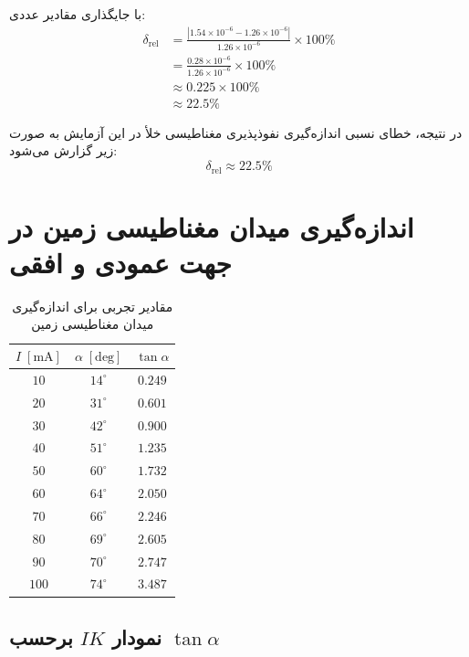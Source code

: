 \documentclass[a4paper, 11pt]{article}
\begin{document}
با جایگذاری مقادیر عددی:
\begin{align}
\delta_{\mathrm{rel}}
&= \frac{|1.54 \times 10^{-6} - 1.26 \times 10^{-6}|}{1.26 \times 10^{-6}} \times 100\% \\[4pt]
&= \frac{0.28 \times 10^{-6}}{1.26 \times 10^{-6}} \times 100\% \\[4pt]
&\approx 0.225 \times 100\% \\[4pt]
&\approx 22.5\%
\end{align}

در نتیجه، خطای نسبی اندازه‌گیری نفوذپذیری مغناطیسی خلأ در این آزمایش به صورت زیر گزارش می‌شود:
\begin{equation}
\boxed{
\delta_{\mathrm{rel}} \approx 22.5\%
}
\end{equation}



\section{ اندازه‌گیری میدان مغناطیسی زمین در جهت عمودی و افقی}

\begin{table}[h!]
\caption{مقادیر تجربی برای اندازه‌گیری میدان مغناطیسی زمین}
\centering
\begin{tabular}{ccc}
\hline
$I \;[\mathrm{mA}]$ & $\alpha \;[\mathrm{deg}]$ & $\tan \alpha$ \\
\hline
$10$ & $14^{\circ}$ & $0.249$ \\
$20$ & $31^{\circ}$ & $0.601$ \\
$30$ & $42^{\circ}$ & $0.900$ \\
$40$ & $51^{\circ}$ & $1.235$ \\
$50$ & $60^{\circ}$ & $1.732$ \\
$60$ & $64^{\circ}$ & $2.050$ \\
$70$ & $66^{\circ}$ & $2.246$ \\
$80$ & $69^{\circ}$ & $2.605$ \\
$90$ & $70^{\circ}$ & $2.747$ \\
$100$ & $74^{\circ}$ & $3.487$ \\
\hline
\end{tabular}
\end{table}


\subsection{نمودار \texorpdfstring{$IK$}{IK} برحسب \texorpdfstring{$\tan\alpha$}{tan alpha}}
\end{document}
